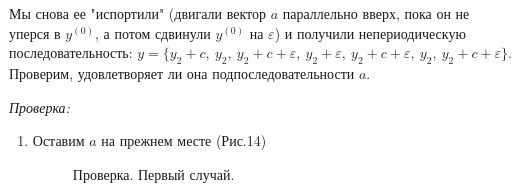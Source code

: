 \documentclass[russian]{lecture-notes}
\begin{document}
Мы снова ее "испортили" (двигали вектор $a$ параллельно вверх, пока он не уперся в $y^{(0)}$, а потом сдвинули $y^{(0)}$ на $\varepsilon$) и получили непериодическую последовательность: $y=\{y_2+c,\ y_2,\ y_2+c+\varepsilon,\ y_2+\varepsilon,\ y_2+c+\varepsilon,\ y_2,\ y_2+c+\varepsilon\}$. Проверим, удовлетворяет ли она подпоследовательности $a$.

\emph{Проверка:}
\begin{enumerate}
\item
Оставим $a$ на прежнем месте (Рис.14)

\begin{figure}[h!]
\caption{Проверка. Первый случай.}
\end{figure}


\end{enumerate}
\end{document}
